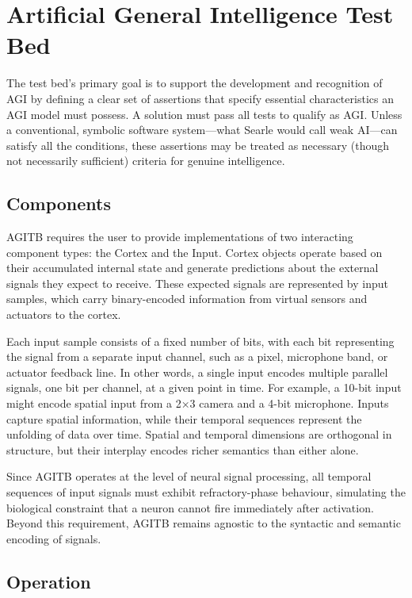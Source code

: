 \documentclass{article}
\begin{document}
\section{Artificial General Intelligence Test Bed}

The test bed's primary goal is to support the development and recognition of AGI by defining a clear set of assertions that specify essential characteristics an AGI model must possess. A solution must pass all tests to qualify as AGI. Unless a conventional, symbolic software system—what Searle \cite{Searle1980} would call weak AI—can satisfy all the conditions, these assertions may be treated as necessary (though not necessarily sufficient) criteria for genuine intelligence.

\subsection{Components}
AGITB requires the user to provide implementations of two interacting component types: the Cortex and the Input. Cortex objects operate based on their accumulated internal state and generate predictions about the external signals they expect to receive. These expected signals are represented by input samples, which carry binary-encoded information from virtual sensors and actuators to the cortex.

Each input sample consists of a fixed number of bits, with each bit representing the signal from a separate input channel, such as a pixel, microphone band, or actuator feedback line. In other words, a single input encodes multiple parallel signals, one bit per channel, at a given point in time. For example, a 10-bit input might encode spatial input from a 2×3 camera and a 4-bit microphone. Inputs capture spatial information, while their temporal sequences represent the unfolding of data over time. Spatial and temporal dimensions are orthogonal in structure, but their interplay encodes richer semantics than either alone. 

Since AGITB operates at the level of neural signal processing, all temporal sequences of input signals must exhibit refractory-phase behaviour, simulating the biological constraint that a neuron cannot fire immediately after activation. Beyond this requirement, AGITB remains agnostic to the syntactic and semantic encoding of signals. 

\subsection{Operation}
\end{document}
